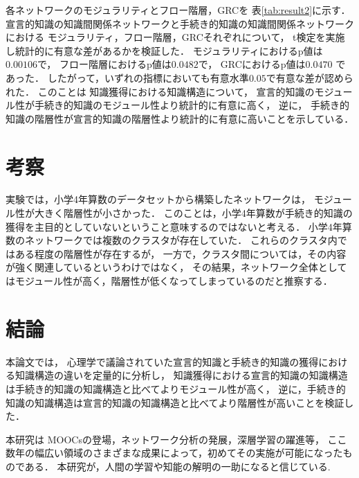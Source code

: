 \documentclass[twocolumn,a4j,10pt]{jsarticle}
\begin{document}
各ネットワークのモジュラリティとフロー階層，GRCを
表\ref{tab:result2}に示す．
宣言的知識の知識間関係ネットワークと手続き的知識の知識間関係ネットワークにおける
モジュラリティ，フロー階層，GRCそれぞれについて，
t検定を実施し統計的に有意な差があるかを検証した．
モジュラリティにおけるp値は$0.00106$で，
フロー階層におけるp値は$0.0482$で，
GRCにおけるp値は$0.0470$
であった．
したがって，いずれの指標においても有意水準$0.05$で有意な差が認められた．
このことは
知識獲得における知識構造について，
宣言的知識のモジュール性が手続き的知識のモジュール性より統計的に有意に高く，
逆に，
手続き的知識の階層性が宣言的知識の階層性より統計的に有意に高いことを示している．

\section{考察}
実験では，小学4年算数のデータセットから構築したネットワークは，
モジュール性が大きく階層性が小さかった．
このことは，小学4年算数が手続き的知識の獲得を主目的としていないということ意味するのではないと考える．
小学4年算数のネットワークでは複数のクラスタが存在していた．
これらのクラスタ内ではある程度の階層性が存在するが，
一方で，クラスタ間については，その内容が強く関連しているというわけではなく，
その結果，ネットワーク全体としてはモジュール性が高く，階層性が低くなってしまっているのだと推察する．



\section{結論}
本論文では，
心理学で議論されていた宣言的知識と手続き的知識の獲得における知識構造の違いを定量的に分析し，
知識獲得における宣言的知識の知識構造は手続き的知識の知識構造と比べてよりモジュール性が高く，
逆に，手続き的知識の知識構造は宣言的知識の知識構造と比べてより階層性が高いことを検証した．

本研究は
MOOCsの登場，ネットワーク分析の発展，深層学習の躍進等，
ここ数年の幅広い領域のさまざまな成果によって，初めてその実施が可能になったものである．
本研究が，人間の学習や知能の解明の一助になると信じている.









%
%


\end{document}
